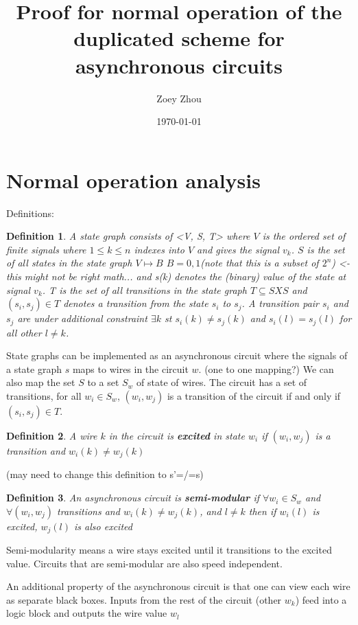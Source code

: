 \documentclass{article}
\title{Proof for normal operation of the duplicated scheme for asynchronous circuits}
\author{Zoey Zhou}
\date{\today}
\newtheorem*{definition}{Definition}
\begin{document}
\section{Normal operation analysis}
Definitions:  
\begin{definition}A state graph consists of <V, S, T> where $V$ is the ordered set of finite signals where $1\leq k \leq n$ indexes into $V$ and gives the signal $v_k$.  $S$ is the set of all states in the state graph $V \mapsto B$  $B={0,1}$(note that this is a subset of $2^n$) <-this might not be right math...
and s(k) denotes the (binary) value of the state at signal $v_k$.  T is the set of all transitions in the state graph $T \subseteq S X S$ and $(s_i, s_j) \in T$ denotes a transition from the state $s_i$ to $s_j$.  A transition pair $s_i$ and $s_j$ are under additional constraint 
$\exists k$ st $s_i(k)\neq s_j(k)$ and $s_i(l)=s_j(l)$ for all other $l \neq k$. \end{definition}
\newline
State graphs can be implemented as an asynchronous circuit where the signals of a state graph $s$ maps to wires in the circuit $w$. (one to one mapping?)  We can also map the set $S$ to a set $S_w$ of state of wires. The circuit has a set of transitions, for all $w_i \in S_w$, 
$(w_i, w_j)$ is a transition of the circuit if and only if $(s_i, s_j) \in T$.
\begin{definition}A wire $k$ in the circuit is \textbf{excited} in state $w_i$ if $(w_i,w_j)$ is a transition and $w_i(k) \neq w_j(k)$\end{definition} (may need to change this definition to s'=/=s)

\begin{definition}An asynchronous circuit is \textbf{semi-modular} if $\forall w_i \in S_w$ and $\forall (w_i,w_j)$ transitions and $w_i(k) \neq w_j(k)$, and $l\neq k$ then if $w_i(l)$ is excited, $w_j(l)$ is also excited \end{definition}
Semi-modularity means a wire stays excited until it transitions to the excited value.  Circuits that are semi-modular are also speed independent. \newline

An additional property of the asynchronous circuit is that one can view each wire as separate black boxes.  Inputs from the rest of the circuit (other $w_k$) feed into a logic block and outputs the wire value $w_l$
\end{document}

